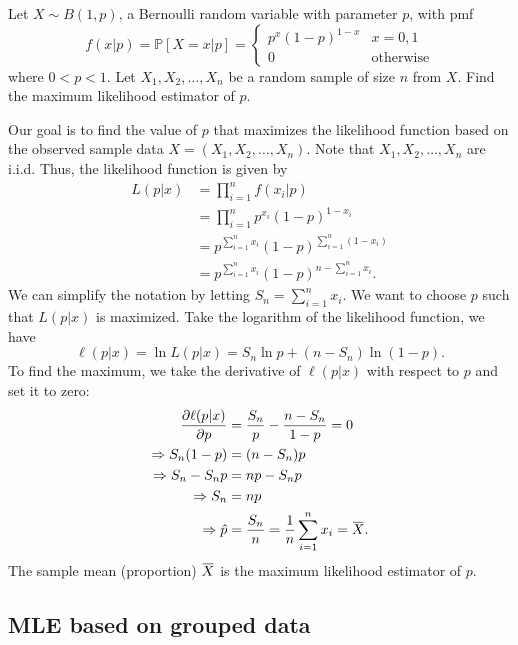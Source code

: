 \begin{example}
    Let $X \sim B(1,p)$, a Bernoulli random variable with parameter $p$, with pmf 
    \[
        f(x|p) = \mathbb{P}[X = x | p] = \begin{cases}
            p^x (1-p)^{1-x} & x = 0, 1\\
            0 & \text{otherwise}
        \end{cases}
    \]
    where $0 < p < 1$. Let $X_1, X_2, \ldots, X_n$ be a random sample of size $n$ from $X$. Find the maximum likelihood estimator of $p$.
\end{example}
\begin{solution}
    Our goal is to find the value of $p$ that maximizes the likelihood function based on the observed sample data 
    $X = (X_1, X_2, \ldots, X_n)$. Note that $X_1, X_2, \ldots, X_n$ are i.i.d. Thus, the likelihood function is given by
    \begin{align*}
        L(p|x) &= \prod_{i=1}^{n} f(x_i | p)\\
        &= \prod_{i=1}^{n} p^{x_i} (1-p)^{1-x_i}\\
        &= p^{\sum_{i=1}^{n} x_i} (1-p)^{\sum_{i=1}^{n}(1-x_i)}\\
        &= p^{\sum_{i=1}^{n} x_i} (1-p)^{n - \sum_{i=1}^{n} x_i}.
    \end{align*}
    We can simplify the notation by letting $S_n = \sum_{i=1}^{n} x_i$. We want to choose $p$ such that $L(p|x)$ is maximized. Take the logarithm of the likelihood function, we have
    \[
        \ell(p|x) = \ln L(p|x) = S_n \ln p + (n - S_n) \ln(1-p).
    \]
    To find the maximum, we take the derivative of $\ell(p|x)$ with respect to $p$ and set it to zero:
    \begin{align*}
        \frac{\partial \ell(p|x)}{\partial p} &= \frac{S_n}{p} - \frac{n - S_n}{1-p} = 0\\
        \Rightarrow S_n(1-p) &= (n - S_n)p\\
        \Rightarrow S_n - S_n p &= np - S_n p\\
        \Rightarrow S_n &= np\\
        \Rightarrow \hat{p} &= \frac{S_n}{n} = \frac{1}{n}\sum_{i=1}^{n} x_i = \ols{X}.
    \end{align*}
    The sample mean (proportion) $\ols{X}$ is the maximum likelihood estimator of $p$.
\end{solution}

\subsection{MLE based on grouped data}

